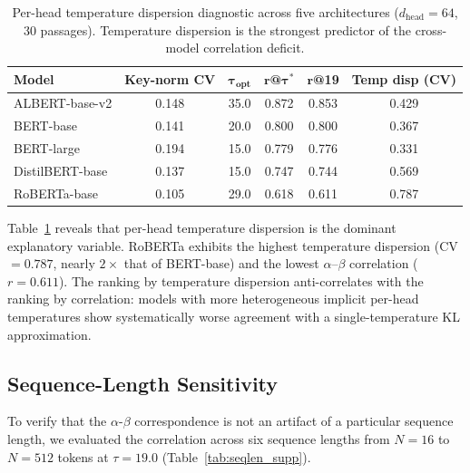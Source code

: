 \documentclass[twoside,11pt]{article}
\begin{document}
\begin{table}[h]
\centering
\renewcommand{\arraystretch}{1.15}
\begin{tabular}{lccccc}
\hline
\textbf{Model} & \textbf{Key-norm CV} & $\boldsymbol{\tau}_{\textbf{opt}}$ & $\boldsymbol{r}$\textbf{@}$\boldsymbol{\tau^*}$ & $\boldsymbol{r}$\textbf{@19} & \textbf{Temp disp (CV)} \\
\hline
ALBERT-base-v2    & 0.148 & 35.0 & 0.872 & 0.853 & 0.429 \\
BERT-base         & 0.141 & 20.0 & 0.800 & 0.800 & 0.367 \\
BERT-large        & 0.194 & 15.0 & 0.779 & 0.776 & 0.331 \\
DistilBERT-base   & 0.137 & 15.0 & 0.747 & 0.744 & 0.569 \\
RoBERTa-base      & 0.105 & 29.0 & 0.618 & 0.611 & 0.787 \\
\hline
\end{tabular}
\caption{Per-head temperature dispersion diagnostic across five architectures ($d_{\text{head}} = 64$, 30 passages). Temperature dispersion is the strongest predictor of the cross-model correlation deficit.}
\label{tab:temp_dispersion_supp}
\end{table}

Table~\ref{tab:temp_dispersion_supp} reveals that per-head temperature dispersion is the dominant explanatory variable. RoBERTa exhibits the highest temperature dispersion (CV $= 0.787$, nearly $2\times$ that of BERT-base) and the lowest $\alpha$--$\beta$ correlation ($r = 0.611$). The ranking by temperature dispersion anti-correlates with the ranking by correlation: models with more heterogeneous implicit per-head temperatures show systematically worse agreement with a single-temperature KL approximation.

\subsection{Sequence-Length Sensitivity}

To verify that the $\alpha$-$\beta$ correspondence is not an artifact of a particular sequence length, we evaluated the correlation across six sequence lengths from $N = 16$ to $N = 512$ tokens at $\tau = 19.0$ (Table~\ref{tab:seqlen_supp}).
\end{document}

